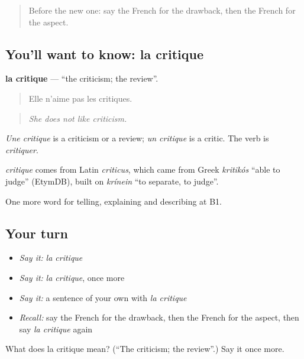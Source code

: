 \begin{quote}
Before the new one: say the French for the drawback, then the French for the aspect.
\end{quote}

\subsection*{You'll want to know: la critique}
\textbf{la critique} — \textquotedblleft{}the criticism; the review\textquotedblright{}.

\begin{quote}
Elle n'aime pas les critiques.
\end{quote}

\begin{quote}
\emph{She does not like criticism.}
\end{quote}

\emph{Une critique} is a criticism or a review; \emph{un critique} is a critic. The verb is \emph{critiquer}.

\begin{cousinweb}
\emph{critique} comes from Latin \emph{criticus}, which came from Greek \emph{kritikós} \textquotedblleft{}able to judge\textquotedblright{} (EtymDB), built on \emph{krínein} \textquotedblleft{}to separate, to judge\textquotedblright{}.
\end{cousinweb}

\begin{grammarlens}[title={What you've built}]
One more word for telling, explaining and describing at B1.
\end{grammarlens}

\subsection*{Your turn}
\begin{itemize}
\raggedright
  \item \emph{Say it:} \emph{la critique}
  \item \emph{Say it:} \emph{la critique}, once more
  \item \emph{Say it:} a sentence of your own with \emph{la critique}
  \item \emph{Recall:} say the French for the drawback, then the French for the aspect, then say \emph{la critique} again
\end{itemize}

\begin{tcolorbox}[breakable,colback=teal!4,colframe=teal!35!black,title={Before you move on}]
What does la critique mean? (\textquotedblleft{}The criticism; the review\textquotedblright{}.) Say it once more.
\end{tcolorbox}

